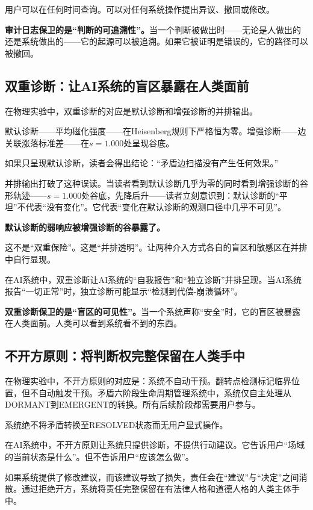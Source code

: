 \documentclass[11pt,a4paper]{book}
\theoremstyle{definition}
\begin{document}
用户可以在任何时间查询。可以对任何系统操作提出异议、撤回或修改。

\textbf{审计日志保卫的是“判断的可追溯性”。}当一个判断被做出时——无论是人做出的还是系统做出的——它的起源可以被追溯。如果它被证明是错误的，它的路径可以被撤回。

\subsection{双重诊断：让AI系统的盲区暴露在人类面前}

在物理实验中，双重诊断的对应是默认诊断和增强诊断的并排输出。

默认诊断——平均磁化强度——在Heisenberg规则下严格恒为零。增强诊断——边关联涨落标准差——在$s=1.000$处呈现谷底。

如果只呈现默认诊断，读者会得出结论：“矛盾边扫描没有产生任何效果。”

并排输出打破了这种误读。当读者看到默认诊断几乎为零的同时看到增强诊断的谷形轨迹——$s=1.000$处谷底，先降后升——读者立刻意识到：默认诊断的“平坦”不代表“没有变化”。它代表“变化在默认诊断的观测口径中几乎不可见”。

\textbf{默认诊断的弱响应被增强诊断的谷暴露了。}

这不是“双重保险”。这是“并排透明”。让两种介入方式各自的盲区和敏感区在并排中自行显现。

在AI系统中，双重诊断让AI系统的“自我报告”和“独立诊断”并排呈现。当AI系统报告“一切正常”时，独立诊断可能显示“检测到代偿-崩溃循环”。

\textbf{双重诊断保卫的是“盲区的可见性”。}当一个系统声称“安全”时，它的盲区被暴露在人类面前。人类可以看到系统看不到的东西。

\subsection{不开方原则：将判断权完整保留在人类手中}

在物理实验中，不开方原则的对应是：系统不自动干预。翻转点检测标记临界位置，但不自动触发干预。矛盾六阶段生命周期管理系统中，系统仅自主处理从DORMANT到EMERGENT的转换。所有后续阶段都需要用户参与。

系统绝不将矛盾转换至RESOLVED状态而无用户显式操作。

在AI系统中，不开方原则让系统只提供诊断，不提供行动建议。它告诉用户“场域的当前状态是什么”。但不告诉用户“应该怎么做”。

如果系统提供了修改建议，而该建议导致了损失，责任会在“建议”与“决定”之间消散。通过拒绝开方，系统将责任完整保留在有法律人格和道德人格的人类主体手中。
\end{document}

